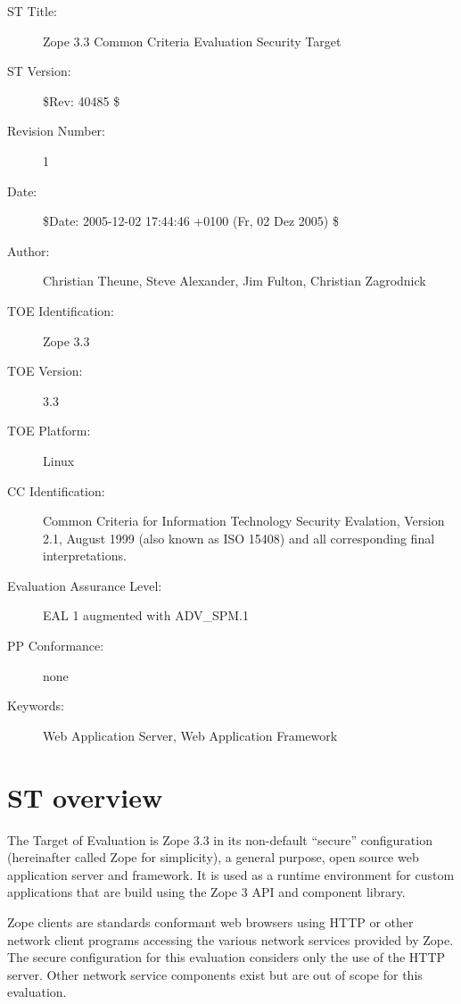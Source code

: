\documentclass[12pt,english]{scrbook}
\begin{document}
\begin{description}
  
  \item[ST Title:] Zope 3.3 Common Criteria Evaluation Security Target
 
  \item[ST Version:] \$Rev: 40485 \$ 

  \item[Revision Number:] 1

  \item[Date:] \$Date: 2005-12-02 17:44:46 +0100 (Fr, 02 Dez 2005) \$ 

  \item[Author:] Christian Theune, Steve Alexander, Jim Fulton, Christian Zagrodnick

  \item[TOE Identification:] Zope 3.3

  \item[TOE Version:] 3.3

  \item[TOE Platform:] Linux

  \item[CC Identification:] Common Criteria for Information Technology Security
  Evalation, Version 2.1, August 1999 (also known as ISO 15408) and all
  corresponding final interpretations.

  \item[Evaluation Assurance Level:] EAL 1 augmented with ADV\_SPM.1

  \item[PP Conformance:] none

  \item[Keywords:] Web Application Server, Web Application Framework
\end{description}


\section{ST overview}

The Target of Evaluation is Zope 3.3 in its non-default ``secure''
configuration (hereinafter called Zope for simplicity), a general purpose, open
source web application server and framework. It is used as a runtime
environment for custom applications that are build using the Zope 3 API and
component library.

Zope clients are standards conformant web browsers using HTTP or other network
client programs accessing the various network services provided by Zope. The
secure configuration for this evaluation considers only the use of the HTTP
server. Other network service components exist but are out of scope for this
evaluation.
\end{document}
